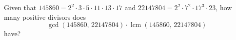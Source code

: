 Given that $145860=2^2\cdot3\cdot5\cdot11\cdot13\cdot17$ and $22147804=2^2\cdot7^2\cdot17^3\cdot23$, how many positive divisors does
\[
\gcd(145860,\,22147804)\cdot\operatorname{lcm}(145860,\,22147804)
\]
have?
